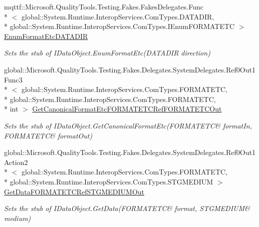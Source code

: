 \begin{DoxyCompactItemize}
mqttf\-::\-Microsoft.\-Quality\-Tools.\-Testing.\-Fakes.\-Fakes\-Delegates.\-Func\\*
$<$ global\-::\-System.\-Runtime.\-Interop\-Services.\-Com\-Types.\-D\-A\-T\-A\-D\-I\-R, \\*
global\-::\-System.\-Runtime.\-Interop\-Services.\-Com\-Types.\-I\-Enum\-F\-O\-R\-M\-A\-T\-E\-T\-C $>$ \hyperlink{class_system_1_1_runtime_1_1_interop_services_1_1_com_types_1_1_fakes_1_1_stub_i_data_object_a031093c158048e5e083d5f251557dea5}{Enum\-Format\-Etc\-D\-A\-T\-A\-D\-I\-R}
\begin{DoxyCompactList}\small\item\em Sets the stub of I\-Data\-Object.\-Enum\-Format\-Etc(\-D\-A\-T\-A\-D\-I\-R direction)\end{DoxyCompactList}\item 
global\-::\-Microsoft.\-Quality\-Tools.\-Testing.\-Fakes.\-Delegates.\-System\-Delegates.\-Ref0\-Out1\-Func3\\*
$<$ global\-::\-System.\-Runtime.\-Interop\-Services.\-Com\-Types.\-F\-O\-R\-M\-A\-T\-E\-T\-C, \\*
global\-::\-System.\-Runtime.\-Interop\-Services.\-Com\-Types.\-F\-O\-R\-M\-A\-T\-E\-T\-C, \\*
int $>$ \hyperlink{class_system_1_1_runtime_1_1_interop_services_1_1_com_types_1_1_fakes_1_1_stub_i_data_object_a4e561804dede3b8edab26c9b74142c3a}{Get\-Canonical\-Format\-Etc\-F\-O\-R\-M\-A\-T\-E\-T\-C\-Ref\-F\-O\-R\-M\-A\-T\-E\-T\-C\-Out}
\begin{DoxyCompactList}\small\item\em Sets the stub of I\-Data\-Object.\-Get\-Canonical\-Format\-Etc(F\-O\-R\-M\-A\-T\-E\-T\-C\& format\-In, F\-O\-R\-M\-A\-T\-E\-T\-C\& format\-Out)\end{DoxyCompactList}\item 
global\-::\-Microsoft.\-Quality\-Tools.\-Testing.\-Fakes.\-Delegates.\-System\-Delegates.\-Ref0\-Out1\-Action2\\*
$<$ global\-::\-System.\-Runtime.\-Interop\-Services.\-Com\-Types.\-F\-O\-R\-M\-A\-T\-E\-T\-C, \\*
global\-::\-System.\-Runtime.\-Interop\-Services.\-Com\-Types.\-S\-T\-G\-M\-E\-D\-I\-U\-M $>$ \hyperlink{class_system_1_1_runtime_1_1_interop_services_1_1_com_types_1_1_fakes_1_1_stub_i_data_object_a4b76bc3aa6929b4885076f5b7ec7bd0d}{Get\-Data\-F\-O\-R\-M\-A\-T\-E\-T\-C\-Ref\-S\-T\-G\-M\-E\-D\-I\-U\-M\-Out}
\begin{DoxyCompactList}\small\item\em Sets the stub of I\-Data\-Object.\-Get\-Data(F\-O\-R\-M\-A\-T\-E\-T\-C\& format, S\-T\-G\-M\-E\-D\-I\-U\-M\& medium)\end{DoxyCompactList}\item 

\end{DoxyCompactItemize}
